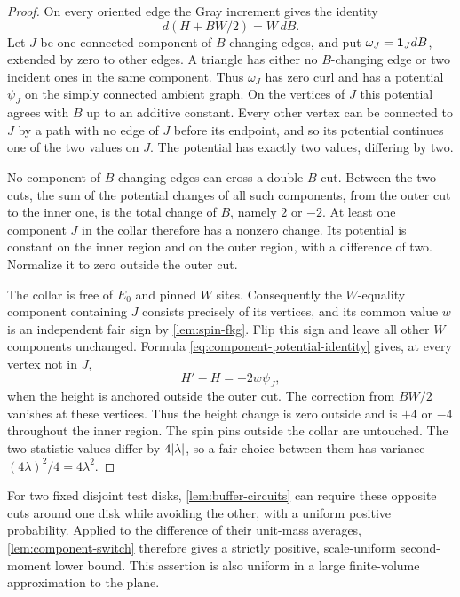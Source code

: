 \begin{proof}
On every oriented edge the Gray increment gives the identity
\begin{equation}\label{eq:component-potential-identity}
 d(H+BW/2)=W\,dB.
\end{equation}
Let $J$ be one connected component of $B$-changing edges, and put
$\omega_J=\mathbf 1_JdB$, extended by zero to other edges.  A triangle has
either no $B$-changing edge or two incident ones in the same component.
Thus $\omega_J$ has zero curl and has a potential $\psi_J$ on the simply
connected ambient graph.  On the vertices of $J$ this potential agrees
with $B$ up to an additive constant.  Every other vertex can be connected
to $J$ by a path with no edge of $J$ before its endpoint, and so its
potential continues one of the two values on $J$.  The potential has
exactly two values, differing by two.

No component of $B$-changing edges can cross a double-$B$ cut.  Between
the two cuts, the sum of the potential changes of all such components,
from the outer cut to the inner one, is the total change of $B$, namely
$2$ or $-2$.  At least one component $J$ in the collar therefore has a
nonzero change.  Its potential is constant on the inner region and on
the outer region, with a difference of two.  Normalize it to zero outside
the outer cut.

The collar is free of $E_0$ and pinned $W$ sites.  Consequently the
$W$-equality component containing $J$ consists precisely of its vertices,
and its common value $w$ is an independent fair sign by
\cref{lem:spin-fkg}.  Flip this sign and leave all other $W$ components
unchanged.  Formula \eqref{eq:component-potential-identity} gives, at every
vertex not in $J$,
\[
 H'-H=-2w\psi_J,
\]
when the height is anchored outside the outer cut.  The correction from
$BW/2$ vanishes at these vertices.  Thus the height change is zero
outside and is $+4$ or $-4$ throughout the inner region.  The spin pins
outside the collar are untouched.  The two statistic values differ by
$4\lvert\lambda\rvert$, so a fair choice between them has variance
$(4\lambda)^2/4=4\lambda^2$.
\end{proof}

For two fixed disjoint test disks, \cref{lem:buffer-circuits} can require
these opposite cuts around one disk while avoiding the other, with a
uniform positive probability.  Applied to the difference of their
unit-mass averages, \cref{lem:component-switch} therefore gives a strictly
positive, scale-uniform second-moment lower bound.  This assertion is
also uniform in a large finite-volume approximation to the plane.

